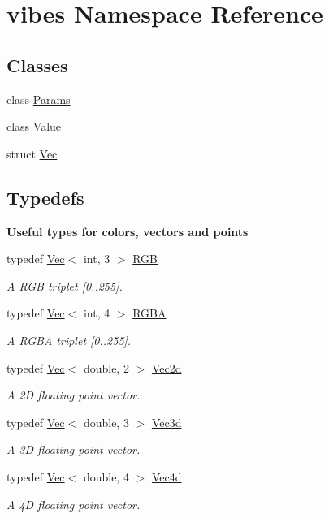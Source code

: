 \hypertarget{namespacevibes}{}\section{vibes Namespace Reference}
\label{namespacevibes}
\subsection*{Classes}
\begin{DoxyCompactItemize}
\item 
class \hyperlink{classvibes_1_1_params}{Params}
\item 
class \hyperlink{classvibes_1_1_value}{Value}
\item 
struct \hyperlink{structvibes_1_1_vec}{Vec}
\end{DoxyCompactItemize}
\subsection*{Typedefs}
\begin{Indent}\textbf{ Useful types for colors, vectors and points}\par
\begin{DoxyCompactItemize}
\item 
typedef \hyperlink{structvibes_1_1_vec}{Vec}$<$ int, 3 $>$ \hyperlink{group__params_gaaacd30b512a79f94ed7ca73276ecd6f9}{R\+GB}
\begin{DoxyCompactList}\small\item\em A R\+GB triplet \mbox{[}0..255\mbox{]}. \end{DoxyCompactList}\item 
typedef \hyperlink{structvibes_1_1_vec}{Vec}$<$ int, 4 $>$ \hyperlink{group__params_gaf49197546b6ee693cc82733217f205ba}{R\+G\+BA}
\begin{DoxyCompactList}\small\item\em A R\+G\+BA triplet \mbox{[}0..255\mbox{]}. \end{DoxyCompactList}\item 
typedef \hyperlink{structvibes_1_1_vec}{Vec}$<$ double, 2 $>$ \hyperlink{group__params_gaf3161ff170c192763988ec53f8f6ee5f}{Vec2d}
\begin{DoxyCompactList}\small\item\em A 2D floating point vector. \end{DoxyCompactList}\item 
typedef \hyperlink{structvibes_1_1_vec}{Vec}$<$ double, 3 $>$ \hyperlink{group__params_gadb53848603b272f3dba56c538387a624}{Vec3d}
\begin{DoxyCompactList}\small\item\em A 3D floating point vector. \end{DoxyCompactList}\item 
typedef \hyperlink{structvibes_1_1_vec}{Vec}$<$ double, 4 $>$ \hyperlink{group__params_gaa6359a0627a612d93c3d007436b7d505}{Vec4d}
\begin{DoxyCompactList}\small\item\em A 4D floating point vector. \end{DoxyCompactList}\end{DoxyCompactItemize}
\end{Indent}
